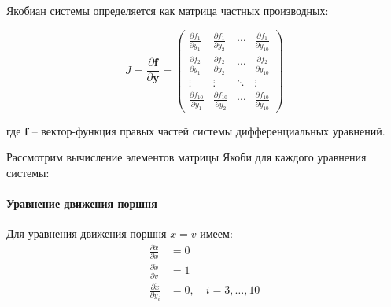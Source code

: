 Якобиан системы определяется как матрица частных производных:

\begin{equation}
\label{eq:ch2/jacobian_matrix}
    J = \frac{\partial \mathbf{f}}{\partial \mathbf{y}} =
    \begin{pmatrix}
        \frac{\partial f_1}{\partial y_1}    & \frac{\partial f_1}{\partial y_2}    & \cdots & \frac{\partial f_1}{\partial y_{10}}    \\
        \frac{\partial f_2}{\partial y_1}    & \frac{\partial f_2}{\partial y_2}    & \cdots & \frac{\partial f_2}{\partial y_{10}}    \\
        \vdots                               & \vdots                               & \ddots & \vdots                                  \\
        \frac{\partial f_{10}}{\partial y_1} & \frac{\partial f_{10}}{\partial y_2} & \cdots & \frac{\partial f_{10}}{\partial y_{10}}
    \end{pmatrix}
\end{equation}

где $\mathbf{f}$ -- вектор-функция правых частей системы дифференциальных уравнений.


Рассмотрим вычисление элементов матрицы Якоби для каждого уравнения системы:

\paragraph{Уравнение движения поршня}
Для уравнения движения поршня $\dot{x} = v$ имеем:
\begin{equation}
\label{eq:ch2/jacobian_motion}
    \begin{aligned}
        \frac{\partial \dot{x}}{\partial x}   & = 0                          \\
        \frac{\partial \dot{x}}{\partial v}   & = 1                          \\
        \frac{\partial \dot{x}}{\partial y_i} & = 0, \quad i = 3, \ldots, 10
    \end{aligned}
\end{equation}

